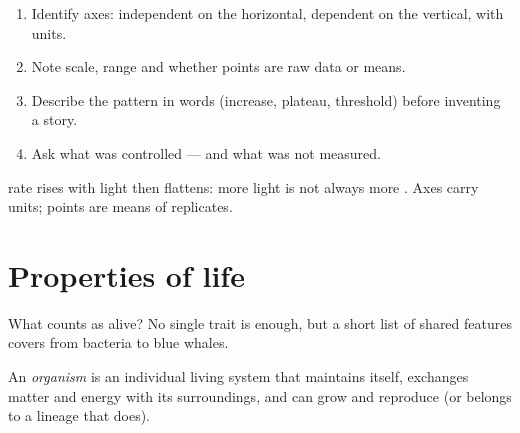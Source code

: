 \begin{method}\label{met:g10:scientific-biology:graph}
\begin{enumerate}
  \item Identify axes: independent on the horizontal, dependent on the
        vertical, with units.
  \item Note scale, range and whether points are raw data or means.
  \item Describe the pattern in words (increase, plateau, threshold)
        before inventing a story.
  \item Ask what was controlled --- and what was not measured.
\end{enumerate}
\end{method}

\begin{omfigure}

{\small {} rate rises with light then flattens: more light is not
always more . Axes carry units; points are means of replicates.}
\end{omfigure}

\section{Properties of life}

What counts as alive? No single trait is enough, but a short list of
shared features covers  from bacteria to blue whales.

\begin{definition}[Organism]\label{def:g10:scientific-biology:organism}
An \emph{organism} is an individual living system that
maintains itself, exchanges matter and energy with its surroundings,
and can grow and reproduce (or belongs to a lineage that does).
\end{definition}

